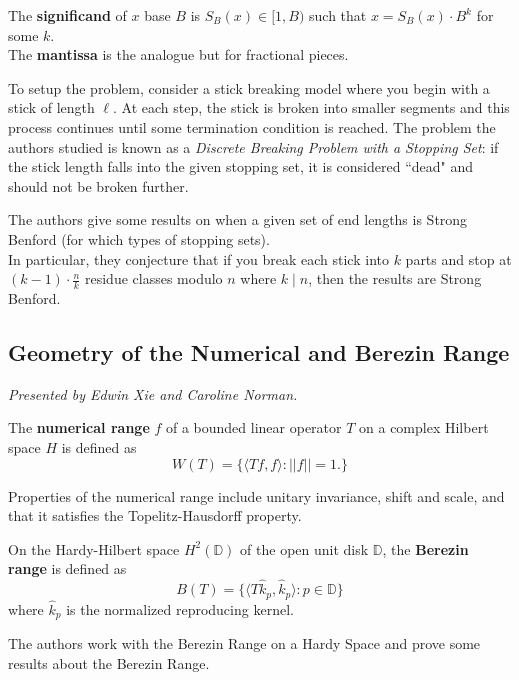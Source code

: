 \documentclass[12pt]{amsart}
\begin{document}
\begin{definition}
The \textbf{significand} of $x$ base $B$ is $S_B(x) \in [1, B)$ such that $x = S_B(x) \cdot B^k$ for some $k$. \\

The \textbf{mantissa} is the analogue but for fractional pieces.
\end{definition}

\vspace{0.5cm}

To setup the problem, consider a stick breaking model where you begin with a stick of length $\ell$. At each step, the stick is broken into smaller segments and this process continues until some termination condition is reached. The problem the authors studied is known as a \textit{Discrete Breaking Problem with a Stopping Set}: if the stick length falls into the given stopping set, it is considered ``dead" and should not be broken further. \\

\begin{result*}
The authors give some results on when a given set of end lengths is Strong Benford (for which types of stopping sets). \\

In particular, they conjecture that if you break each stick into $k$ parts and stop at $(k-1) \cdot \frac{n}{k}$ residue classes modulo $n$ where $k \mid n$, then the results are Strong Benford.
\end{result*}

\vspace{2.5cm}

\subsection{Geometry of the Numerical and Berezin Range}

\textit{}
\vspace{0.25cm}

\textit{Presented by Edwin Xie and Caroline Norman.}

\begin{definition}
The \textbf{numerical range} $f$ of a bounded linear operator $T$ on a complex Hilbert space $H$ is defined as
\[ W(T) = \{\langle Tf, f \rangle : ||f|| = 1.\} \]

Properties of the numerical range include unitary invariance, shift and scale, and that it satisfies the Topelitz-Hausdorff property.
\end{definition}

\begin{definition}
On the Hardy-Hilbert space $H^2(\mathbb{D})$ of the open unit disk $\mathbb{D}$, the \textbf{Berezin range} is defined as 
\[B(T) = \{ \langle T\hat{k}_p, \hat{k}_p \rangle : p \in \mathbb{D}\}\]
where $\hat{k}_p$ is the normalized reproducing kernel.

\end{definition}
\begin{result*}
The authors work with the Berezin Range on a Hardy Space and prove some results about the Berezin Range.
\end{result*}
\end{document}
